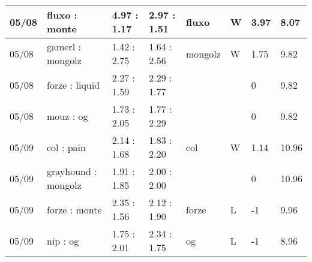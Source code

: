 \begin{small}
\begin{longtable}{|l|l|l|l|l|l|l|l|}
	05/08                               & fluxo : monte                       & 4.97 : 1.17                             & 2.97 : 1.51                             & fluxo                             & W                                 & 3.97                                 & 8.07                              \\ \hline
	05/08                               & gamerl : mongolz                    & 1.42 : 2.75                             & 1.64 : 2.56                             & mongolz                           & W                                 & 1.75                                 & 9.82                              \\ \hline
	05/08                               & forze : liquid                      & 2.27 : 1.59                             & 2.29 : 1.77                             &                                   &                                   & 0                                    & 9.82                              \\ \hline
	05/08                               & mouz : og                           & 1.73 : 2.05                             & 1.77 : 2.29                             &                                   &                                   & 0                                    & 9.82                              \\ \hline
	05/09                               & col : pain                          & 2.14 : 1.68                             & 1.83 : 2.20                             & col                               & W                                 & 1.14                                 & 10.96                             \\ \hline
	05/09                               & grayhound : mongolz                 & 1.91 : 1.85                             & 2.00 : 2.00                             &                                   &                                   & 0                                    & 10.96                             \\ \hline
	05/09                               & forze : monte                       & 2.35 : 1.56                             & 2.12 : 1.90                             & forze                             & L                                 & -1                                   & 9.96                              \\ \hline
	05/09                               & nip : og                            & 1.75 : 2.01                             & 2.34 : 1.75                             & og                                & L                                 & -1                                   & 8.96                              \\ \hline

\end{longtable}
\end{small}
